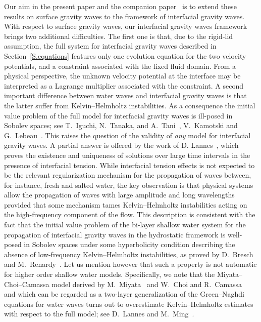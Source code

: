 \documentclass[11pt,leqno]{article}
\numberwithin{equation}{section}
\numberwithin{figure}{section}
\begin{document}
Our aim in the present paper and the companion paper~\cite{DucheneIguchi2020} is to extend these results 
on surface gravity waves to the framework of interfacial gravity waves. 
With respect to surface gravity waves, our interfacial gravity waves framework brings two additional difficulties.
The first one is that, due to the rigid-lid assumption, the full system for interfacial gravity waves 
described in Section~\ref{S.equations} features only one evolution equation for the two velocity potentials,
and a constraint associated with the fixed fluid domain. From a physical perspective, the unknown velocity potential 
at the interface may be interpreted as a Lagrange multiplier associated with the constraint.
A second important difference between water waves and interfacial gravity waves is that the latter suffer from
Kelvin--Helmholtz instabilities. As a consequence the initial value problem of the full model for interfacial 
gravity waves is ill-posed in Sobolev spaces; 
see T.~Iguchi, N.~Tanaka, and A.~Tani~\cite{IguchiTanakaTani1997}, V.~Kamotski and G.~Lebeau~\cite{KamotskiLebeau2005}. 
This raises the question of the validity of {\em any} model for interfacial gravity waves. A partial answer is offered
by the work of D. Lannes~\cite{Lannes2013}, which proves the existence and uniqueness of solutions over large time intervals
in the presence of interfacial tension. While interfacial tension effects is not expected to be the relevant regularization mechanism 
for the propagation of waves between, for instance, fresh and salted water, the key observation is that physical systems allow 
the propagation of waves with large amplitude and long wavelengths provided that some mechanism tames Kelvin--Helmholtz instabilities
acting on the high-frequency component of the flow. This description is consistent with the fact that the initial value problem 
of the bi-layer shallow water system for the propagation of interfacial gravity waves in the hydrostatic framework is well-posed 
in Sobolev spaces under some hyperbolicity condition describing the absence of low-frequency Kelvin--Helmholtz instabilities, as
proved by D.~Bresch and M.~Renardy~\cite{BreschRenardy11}. Let us mention however that such a property is not automatic for 
higher order shallow water models. Specifically, we note that the Miyata--Choi--Camassa model derived by M.~Miyata~\cite{Miyata85} and 
W.~Choi and R.~Camassa~\cite{ChoiCamassa99} and which can be regarded as a two-layer generalization of the Green--Naghdi equations for water waves 
turns out to overestimate Kelvin--Helmholtz estimates with respect to the full model; see D.~Lannes and M.~Ming~\cite{LannesMing15}.
\end{document}
